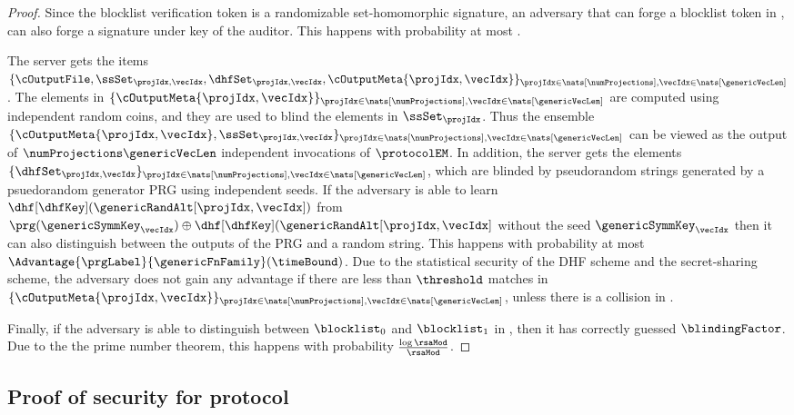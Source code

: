 \begin{proof}

Since the blocklist verification token is a randomizable set-homomorphic signature, an adversary that can forge a blocklist token in \unforgeBlocklistExp, can also forge a signature under key of the auditor. This happens with probability at most \ufcmaAdv. 

The server gets the items $\{\cOutputFile, \ssSet_{\projIdx, \vecIdx}, \dhfSet_{\projIdx, \vecIdx}, \cOutputMeta{\projIdx, \vecIdx}\}_{\projIdx \in \nats[\numProjections], \vecIdx \in \nats[\genericVecLen]}$. The elements in $\{\cOutputMeta{\projIdx, \vecIdx}\}_{\projIdx \in \nats[\numProjections], \vecIdx \in \nats[\genericVecLen]}$ are computed using independent random coins, and they are used to blind the elements in $\ssSet_{\projIdx}$. Thus the ensemble $\{\cOutputMeta{\projIdx, \vecIdx}, \ssSet_{\projIdx, \vecIdx} \}_{\projIdx \in \nats[\numProjections], \vecIdx \in \nats[\genericVecLen]}$ can be viewed as 
the output of $\numProjections \genericVecLen$ 	independent invocations of 
$\protocolEM$. In addition, the server gets the elements $\{  \dhfSet_{\projIdx, \vecIdx} \}_{\projIdx \in \nats[\numProjections], \vecIdx \in \nats[\genericVecLen]}$, which are blinded by pseudorandom strings generated by a psuedorandom generator PRG using independent seeds. 
If the adversary is able to learn $\dhf[\dhfKey](\genericRandAlt[\projIdx, \vecIdx])$ from $\prg(\genericSymmKey_\vecIdx) \oplus \dhf[\dhfKey](\genericRandAlt[\projIdx, \vecIdx]$ without the seed $\genericSymmKey_\vecIdx$ then it can also distinguish between the outputs of the PRG and a random string. This happens with probability at most $\Advantage{\prgLabel}{\genericFnFamily}(\timeBound)$. 
Due to the statistical security of the DHF scheme and the secret-sharing scheme, the adversary does not gain any advantage if there are less than $\threshold$ matches in 
$\{\cOutputMeta{\projIdx, \vecIdx}\}_{\projIdx \in \nats[\numProjections], \vecIdx \in \nats[\genericVecLen]}$, unless there is a collision in \primeRO. 


Finally, if the adversary is able to distinguish between $\blocklist_0$ and $\blocklist_1$ in \hidingBlocklistExp, then it has correctly guessed $\blindingFactor$. Due to the the prime number theorem, this happens with probability $\frac{\log \rsaMod}{\rsaMod}$.

\end{proof}


\subsection{Proof of security for protocol \protocolEMP}
\label{sec:proof:emp}
%

